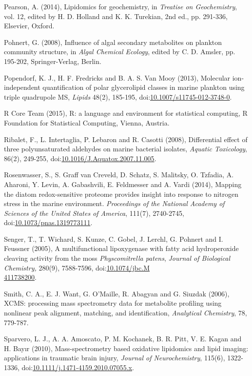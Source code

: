 \begin{singlespace}
{{Pearson, A. (2014), Lipidomics for geochemistry, in \emph{Treatise on Geochemistry}, vol. 12, edited by H. D. Holland and K. K. Turekian, 2nd ed., pp. 291-336, Elsevier, Oxford.

Pohnert, G. (2008), Influence of algal secondary metabolites on plankton community structure, in \emph{Algal Chemical Ecology}, edited by C. D. Amsler, pp. 195-202, Springer-Verlag, Berlin.

Popendorf, K. J., H. F. Fredricks and B. A. S. Van Mooy (2013), Molecular ion-independent quantification of polar glycerolipid classes in marine plankton using triple quadrupole MS, \emph{Lipids} 48(2), 185-195, doi:\href{http://dx.doi.org/10.1007/s11745-012-3748-0}{10.1007/s11745-012-3748-0}.

R Core Team (2015), R: a language and environment for statistical computing, R Foundation for Statistical Computing, Vienna, Austria.

Ribalet, F., L. Intertaglia, P. Lebaron and R. Casotti (2008), Differential effect of three polyunsaturated aldehydes on marine bacterial isolates, \emph{Aquatic Toxicology}, 86(2), 249-255, doi:\href{http://dx.doi.org/10.1016/J.Aquatox.2007.11.005}{10.1016/J.Aquatox.2007.11.005}.

Rosenwasser, S., S. Graff van Creveld, D. Schatz, S. Malitsky, O. Tzfadia, A. Aharoni, Y. Levin, A. Gabashvili, E. Feldmesser and A. Vardi (2014), Mapping the diatom redox-sensitive proteome provides insight into response to nitrogen stress in the marine environment. \emph{Proceedings of the National Academy of Sciences of the United States of America}, 111(7), 2740-2745, doi:\href{http://dx.doi.org/10.1073/pnas.1319773111}{10.1073/pnas.1319773111}.

Senger, T., T. Wichard, S. Kunze, C. Gobel, J. Lerchl, G. Pohnert and I. Feussner (2005), A multifunctional lipoxygenase with fatty acid hydroperoxide cleaving activity from the moss \emph{Physcomitrella patens}, \emph{Journal of Biological Chemistry,} 280(9), 7588-7596, doi:\href{http://dx.doi.org/10.1074/jbc.M411738200}{10.1074/jbc.M\\411738200}.

Smith, C. A., E. J. Want, G. O'Maille, R. Abagyan and G. Siuzdak (2006), XCMS: processing mass spectrometry data for metabolite profiling using nonlinear peak alignment, matching, and identification, \emph{Analytical Chemistry}, 78, 779-787.

Sparvero, L. J., A. A. Amoscato, P. M. Kochanek, B. R. Pitt, V. E. Kagan and H. Bayır (2010), Mass-spectrometry based oxidative lipidomics and lipid imaging: applications in traumatic brain injury, \emph{Journal of Neurochemistry}, 115(6), 1322-1336, doi:\href{http://dx.doi.org/10.1111/j.1471-4159.2010.07055.x}{10.1111/j.1471-4159.2010.07055.x}.

}}
\end{singlespace}
